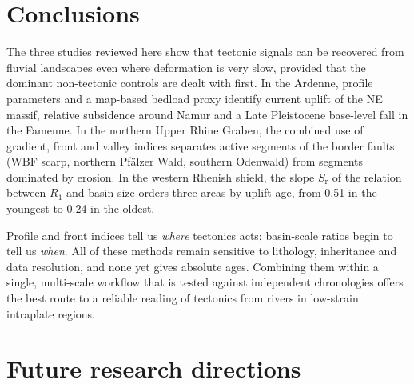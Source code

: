 \documentclass[10pt,a4paper,twocolumn]{article}
\begin{document}
\section{Conclusions}

The three studies reviewed here show that tectonic signals can be recovered from fluvial landscapes even
where deformation is very slow, provided that the dominant non-tectonic controls are dealt with first.
In the Ardenne, profile parameters and a map-based bedload proxy identify current uplift of the NE
massif, relative subsidence around Namur and a Late Pleistocene base-level fall in the Famenne. In the
northern Upper Rhine Graben, the combined use of gradient, front and valley indices separates active
segments of the border faults (WBF scarp, northern Pfälzer Wald, southern Odenwald) from segments
dominated by erosion. In the western Rhenish shield, the slope $S_\mathrm{r}$ of the relation between
$R_1$ and basin size orders three areas by uplift age, from 0.51 in the youngest to 0.24 in the oldest.

Profile and front indices tell us \emph{where} tectonics acts; basin-scale ratios begin to tell us
\emph{when}. All of these methods remain sensitive to lithology, inheritance and data resolution, and
none yet gives absolute ages. Combining them within a single, multi-scale workflow that is tested
against independent chronologies offers the best route to a reliable reading of tectonics from rivers in
low-strain intraplate regions.

\section{Future research directions}
\end{document}
